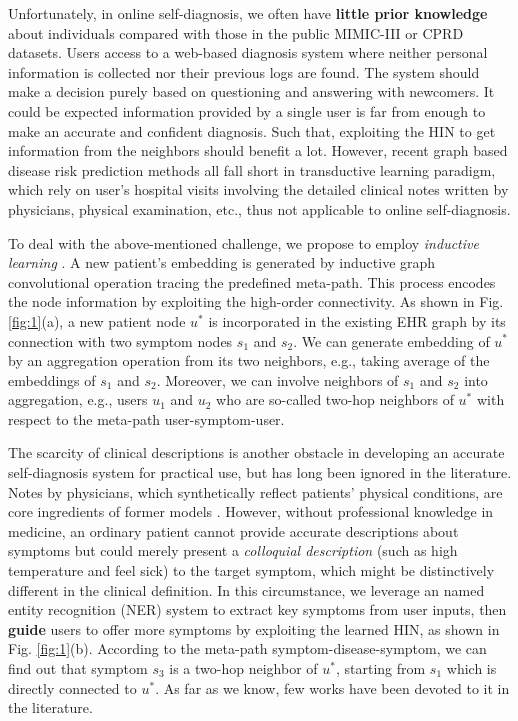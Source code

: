 \documentclass[sigconf]{acmart}
\begin{document}
Unfortunately, in online self-diagnosis, we often have \textbf{little prior knowledge} about individuals compared with those in the public MIMIC-III or CPRD datasets. Users access to a web-based diagnosis system where neither personal information is collected nor their previous logs are found. The system should make a decision purely based on questioning and answering with newcomers. It could be expected information provided by a single user is far from enough to make an accurate and confident diagnosis. Such that, exploiting the HIN to get information from the neighbors should benefit a lot. However, recent graph based disease risk prediction methods \cite{hosseini2018heteromed, hosseini2019hierarchical, hettige2019medgraph} all fall short in transductive learning paradigm, which rely on user's hospital visits involving the detailed clinical notes written by physicians, physical examination, etc., thus not applicable to online self-diagnosis.

To deal with the above-mentioned challenge, we propose to employ \emph{inductive learning} \cite{hamilton2017inductive}. A new patient's embedding is generated by inductive graph convolutional operation tracing the predefined meta-path. This process encodes the node information by exploiting the high-order connectivity. As shown in Fig. \ref{fig:1}(a), a new patient node $u^*$ is incorporated in the existing EHR graph by its connection with two symptom nodes $s_1$ and $s_2$. We can generate embedding of $u^*$ by an aggregation operation from its two neighbors, e.g., taking average of the embeddings of $s_1$ and $s_2$. Moreover, we can involve neighbors of $s_1$ and $s_2$ into aggregation, e.g., users $u_1$ and $u_2$ who are so-called two-hop neighbors of $u^*$ with respect to the meta-path user-symptom-user.

The scarcity of clinical descriptions is another obstacle in developing an accurate self-diagnosis system for practical use, but has long been ignored in the literature. Notes by physicians, which synthetically reflect patients' physical conditions, are core ingredients of former models \cite{hosseini2018heteromed, hosseini2019hierarchical}. However, without professional knowledge in medicine, an ordinary patient cannot provide accurate descriptions about symptoms but could merely present a \emph{colloquial description} (such as high temperature and feel sick) to the target symptom, which might be distinctively different in the clinical definition. In this circumstance, we leverage an named entity recognition (NER) system to extract key symptoms from user inputs, then \textbf{guide} users to offer more symptoms by exploiting the learned HIN, as shown in Fig. \ref{fig:1}(b). According to the meta-path symptom-disease-symptom, we can find out that symptom $s_3$ is a two-hop neighbor of $u^*$, starting from $s_1$ which is directly connected to $u^*$.  As far as we know, few works have been devoted to it in the literature.
\end{document}
